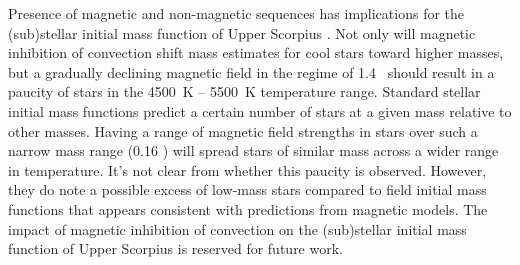 \documentclass{aa}
\begin{document}

Presence of magnetic and non-magnetic sequences has implications for the (sub)stellar initial mass function of Upper Scorpius \citep{Ardila2000, Preibisch2002}. Not only will magnetic inhibition of convection shift mass estimates for cool stars toward higher masses, but a gradually declining magnetic field in the regime of 1.4 \msun\ should result in a paucity of stars in the 4500~K -- 5500~K temperature range. Standard stellar initial mass functions \citep[e.g.,][]{Salpeter1955, Kroupa2002} predict a certain number of stars at a given mass relative to other masses. Having a range of magnetic field strengths in stars over such a narrow mass range (0.16 \msun) will spread stars of similar mass across a wider range in temperature. It's not clear from \citet{Preibisch2002} whether this paucity is observed. However, they do note a possible excess of low-mass stars compared to field initial mass functions \citep{Scalo1998, Kroupa2002} that appears consistent with predictions from magnetic models. The impact of magnetic inhibition of convection on the (sub)stellar initial mass function of Upper Scorpius is reserved for future work.

\end{document}
